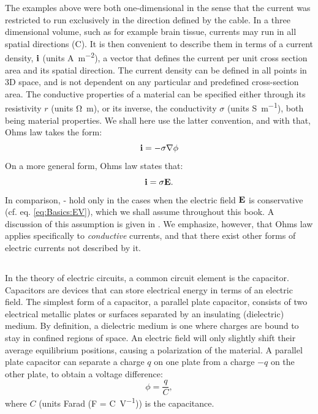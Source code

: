 The examples above were both one-dimensional in the sense that the current was restricted to run exclusively in the direction defined by the cable. In a three dimensional volume, such as for example brain tissue, currents may run in all spatial directions (C). It is then convenient to describe them in terms of a current density, ${\bf i}$ (units \si{\ampere\per\square\metre}), a vector that defines the current per unit cross section area and its spatial direction. The current density can be defined in all points in 3D space, and is not dependent on any particular and predefined cross-section area. The conductive properties of a material can be specified either through its resistivity $r$ (units \si{\ohm\metre}), or its inverse, the conductivity $\sigma$ (units \si{\siemens\per\metre}), both being material properties. We shall here use the latter convention, and with that, Ohms law  takes the form:
\begin{equation}
{\bf i} = - \sigma {\bf \nabla} \phi
\label{eq:Basics:Ohm_3D_phi}
\end{equation}
%
On a more general form, Ohms law states that:
\begin{equation}
{\bf i} = \sigma {\bf E}.
\label{eq:Basics:Ohm_general}
\end{equation}
In comparison, - hold only in the cases when the electric field ${\bf E}$ is conservative (cf. eq. \ref{eq:Basics:EV}),  which we shall assume throughout this book. A discussion of this assumption is given in . We emphasize, however, that Ohms law applies specifically to \textit{conductive} currents, and that there exist other forms of electric currents not described by it.


\subsection{}
\label{sec:Basics:CapacitiveCurrent} 
In the theory of electric circuits, a common circuit element is the capacitor. Capacitors are devices that can store electrical energy in terms of an electric field.
The simplest form of a capacitor, a parallel plate capacitor, consists of two electrical metallic plates or surfaces separated by an insulating (dielectric) medium.  By definition, a dielectric medium is one where charges are bound to stay in confined regions of space. An electric field will only slightly shift their average equilibrium positions, causing a polarization of the material. A parallel plate capacitor can separate a charge $q$ on one plate from a charge $-q$ on the other plate, to obtain a voltage difference:
\begin{equation}
\phi = \frac{q}{C}, 
\label{eq:Basics:Vcap}
\end{equation}
where $C$ (units Farad (\si{\farad} = \si{\coulomb\per\volt})) is the capacitance. 

